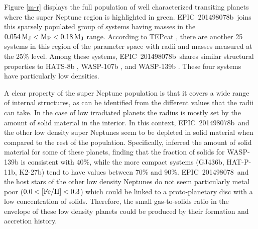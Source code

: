 \documentclass[useAMS,usenatbib]{mnras}
\newcommand{\feh}{\ensuremath{{\rm [Fe/H]}}}
\newcommand{\teq}{\ensuremath{T_{\rm eq}}}
\newcommand{\mjup}{\ensuremath{{\rm M_{J}}}}
\newcommand{\mpl}{\ensuremath{{\rm M_P}}}
\newcommand{\plname}{EPIC~201498078b}
\newcommand{\stname}{EPIC~201498078}
\begin{document}
Figure \ref{m-r} displays the full population of well characterized
transiting planets where the super Neptune region is highlighted in green.
\plname\ joins this sparsely populated group of systems
having masses in the $0.054\,\mjup < \mpl < 0.18\,\mjup$ range.
According to TEPcat \citep{tepcat}, there are another 25 systems in this region
of the parameter space with radii and masses measured at the
25\% level. Among these systems, \plname\ shares similar structural properties to HATS-8b \citep{hats-8b}, WASP-107b \citep{wasp-107b}, and WASP-139b \citep{wasp-139b}. These four systems have particularly low densities.

A clear property of the super Neptune population is that it covers
a wide range of internal structures, as can be identified from the
different values that the radii can take. In the case of low irradiated
planets \citep[$\teq < 1000$\,K,][]{kovacs:2010} the radius is mostly set by the
amount of solid material in the interior. In this context, \plname\ and the
other low density super Neptunes seem to be depleted in solid material when compared to the rest of the population. Specifically, \citet{thorngren:2016} inferred the amount of solid material for some of these planets, finding that the fraction of solids for WASP-139b is consistent with 40\%, while the more compact systems (GJ436b, HAT-P-11b, K2-27b) tend to have values between 70\% and 90\%. \stname\ and the host stars of the other low density Neptunes do not seem particularly metal poor ($0.0<\feh<0.3$) which could be linked to a proto-planetary disc with a low concentration of solids. Therefore, the small gas-to-solids ratio in the envelope of these low density planets could be produced by their formation and accretion history.
\end{document}
